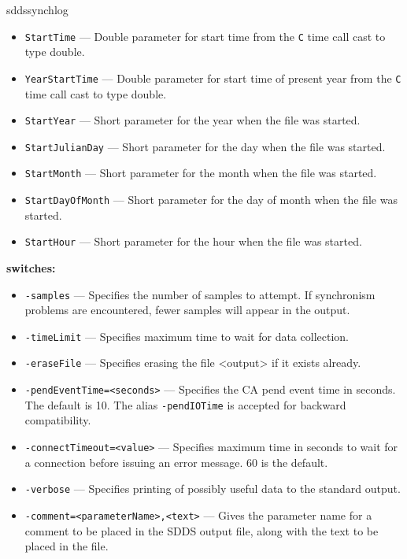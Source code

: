 \begin{sddsprog}{sddssynchlog}
\begin{itemize}
\begin{itemize}
        \item {\tt StartTime} --- Double parameter for start time from the {\tt C} time call cast to type double.
        \item {\tt YearStartTime} --- Double parameter for start time of present year from the {\tt C} time call cast to type double.
        \item {\verb+StartYear+} --- Short parameter for the year when the file was started.
        \item {\verb+StartJulianDay+} --- Short parameter for the day when the file was started.
        \item {\verb+StartMonth+} --- Short parameter for the month when the file was started.
        \item {\verb+StartDayOfMonth+} --- Short parameter for the day of month when the file was started.
        \item {\verb+StartHour+} --- Short parameter for the hour when the file was started.
\end{itemize}
\end{itemize}
%
\item {\bf switches:}
%
%
    \begin{itemize}
%
        \item {\tt -samples} --- Specifies the number of samples to attempt.  If synchronism problems
                are encountered, fewer samples will appear in the output.
        \item {\tt -timeLimit} --- Specifies maximum time to wait for data collection.
        \item {\tt -eraseFile} --- Specifies erasing the file <output> if it exists already.
        \item {\tt -pendEventTime=<seconds>} --- Specifies the CA pend event time in seconds.  The
                default is 10.  The alias \verb+-pendIOTime+ is accepted for backward compatibility.
        \item {\tt -connectTimeout=<value>} --- Specifies maximum time in seconds to wait for a connection before
                issuing an error message. 60 is the default.
        \item {\tt -verbose} --- Specifies printing of possibly useful data to the standard output.
        \item {\verb+-comment=<parameterName>,<text>+} ---
                Gives the parameter name for a comment to be placed in the SDDS output file,
                along with the text to be placed in the file.

\end{itemize}
\end{sddsprog}
